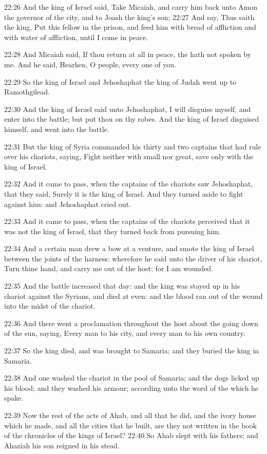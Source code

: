 22:26 And the king of Israel said, Take Micaiah, and carry him back
unto Amon the governor of the city, and to Joash the king's son; 22:27
And say, Thus saith the king, Put this fellow in the prison, and feed
him with bread of affliction and with water of affliction, until I
come in peace.

22:28 And Micaiah said, If thou return at all in peace, the \LORD hath
not spoken by me. And he said, Hearken, O people, every one of you.

22:29 So the king of Israel and Jehoshaphat the king of Judah went up
to Ramothgilead.

22:30 And the king of Israel said unto Jehoshaphat, I will disguise
myself, and enter into the battle; but put thou on thy robes. And the
king of Israel disguised himself, and went into the battle.

22:31 But the king of Syria commanded his thirty and two captains that
had rule over his chariots, saying, Fight neither with small nor
great, save only with the king of Israel.

22:32 And it came to pass, when the captains of the chariots saw
Jehoshaphat, that they said, Surely it is the king of Israel. And they
turned aside to fight against him: and Jehoshaphat cried out.

22:33 And it came to pass, when the captains of the chariots perceived
that it was not the king of Israel, that they turned back from
pursuing him.

22:34 And a certain man drew a bow at a venture, and smote the king of
Israel between the joints of the harness: wherefore he said unto the
driver of his chariot, Turn thine hand, and carry me out of the host;
for I am wounded.

22:35 And the battle increased that day: and the king was stayed up in
his chariot against the Syrians, and died at even: and the blood ran
out of the wound into the midst of the chariot.

22:36 And there went a proclamation throughout the host about the
going down of the sun, saying, Every man to his city, and every man to
his own country.

22:37 So the king died, and was brought to Samaria; and they buried
the king in Samaria.

22:38 And one washed the chariot in the pool of Samaria; and the dogs
licked up his blood; and they washed his armour; according unto the
word of the \LORD which he spake.

22:39 Now the rest of the acts of Ahab, and all that he did, and the
ivory house which he made, and all the cities that he built, are they
not written in the book of the chronicles of the kings of Israel?
22:40 So Ahab slept with his fathers; and Ahaziah his son reigned in
his stead.

